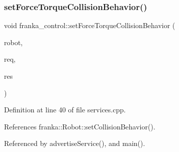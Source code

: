 \subsubsection{\texorpdfstring{set\+Force\+Torque\+Collision\+Behavior()}{setForceTorqueCollisionBehavior()}}
{\footnotesize\ttfamily void franka\+\_\+control\+::set\+Force\+Torque\+Collision\+Behavior (\begin{DoxyParamCaption}\item[{\hyperlink{classfranka_1_1Robot}{franka\+::\+Robot} \&}]{robot,  }\item[{const Set\+Force\+Torque\+Collision\+Behavior\+::\+Request \&}]{req,  }\item[{Set\+Force\+Torque\+Collision\+Behavior\+::\+Response \&}]{res }\end{DoxyParamCaption})}



Definition at line 40 of file services.\+cpp.



References franka\+::\+Robot\+::set\+Collision\+Behavior().



Referenced by advertise\+Service(), and main().


